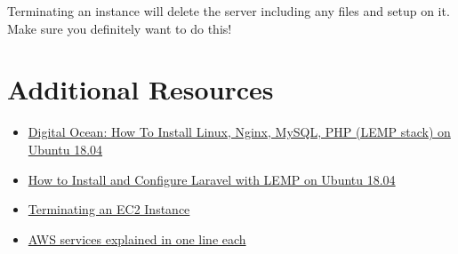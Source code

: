 Terminating an instance will delete the server including any files and setup on it. Make sure you definitely want to do this!


\section{Additional Resources}

\begin{itemize}[leftmargin=*]
    \item \href{https://www.digitalocean.com/community/tutorials/how-to-install-linux-nginx-mysql-php-lemp-stack-ubuntu-18-04}{Digital Ocean: How To Install Linux, Nginx, MySQL, PHP (LEMP stack) on Ubuntu 18.04}
    \item \href{https://www.digitalocean.com/community/tutorials/how-to-install-and-configure-laravel-with-lemp-on-ubuntu-18-04}{How to Install and Configure Laravel with LEMP on Ubuntu 18.04}
    \item \href{https://docs.aws.amazon.com/AWSEC2/latest/UserGuide/terminating-instances.html}{Terminating an EC2 Instance}
    \item \href{https://adayinthelifeof.nl/2020/05/20/aws.html}{AWS services explained in one line each}
\end{itemize}
